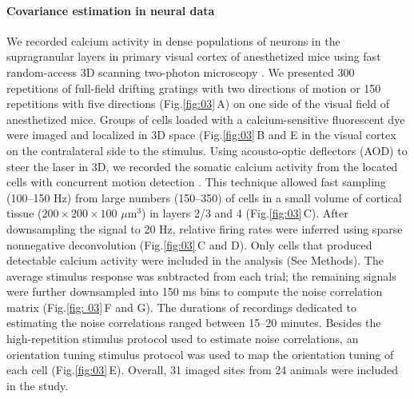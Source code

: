 \documentclass[10pt]{article}
\newcommand{\figref}[2]{Fig.\;\ref{fig:#1}\,#2}
\begin{document}
\paragraph{Covariance estimation in neural data}
We recorded calcium activity in dense populations of neurons in the supragranular layers in primary visual cortex of anesthetized mice using fast random-access 3D scanning two-photon microscopy \cite{Reddy:2005, Katona:2012, Cotton:2013}. We presented 300 repetitions of full-field drifting gratings with two directions of motion or 150 repetitions with five directions (\figref{03}{A}) on one side of the visual field of anesthetized mice. Groups of cells loaded with a calcium-sensitive fluorescent dye were imaged and localized in 3D space (\figref{03}{B and E} in the visual cortex on the contralateral side to the stimulus. Using acousto-optic deflectors (AOD) to steer the laser in 3D,  we recorded the somatic calcium activity from the located cells with concurrent motion detection \cite{Cotton:2013}.  This technique allowed fast sampling (100--150 Hz) from large numbers (150--350) of cells in a small volume of cortical tissue ($200\times200\times100$ $\mu$m$^3$) in layers 2/3 and 4 (\figref{03}{C}). After downsampling the signal to 20 Hz, relative firing rates were inferred using sparse nonnegative deconvolution \cite{Vogelstein:2010} (\figref{03}{C and D}). Only cells that produced detectable calcium activity were included in the analysis (See Methods). The average stimulus response was subtracted from each trial; the remaining signals were further downsampled into 150 ms bins to compute the noise correlation matrix (\figref{ 03}{F and G}). The durations of recordings dedicated to estimating the noise correlations ranged between 15--20 minutes.  Besides the high-repetition stimulus protocol used to estimate noise correlations, an orientation tuning stimulus protocol was used to map the orientation tuning of each cell (\figref{03}{E}). Overall, 31 imaged sites from 24 animals were included in the study.
\end{document}
